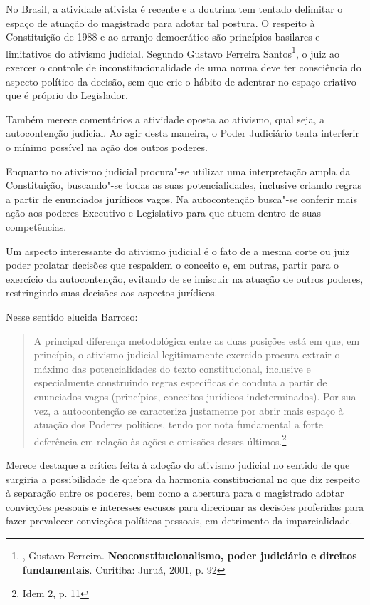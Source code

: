 No Brasil, a atividade ativista é recente e a doutrina tem tentado
delimitar o espaço de atuação do magistrado para adotar tal postura. O
respeito à Constituição de 1988 e ao arranjo democrático são princípios
basilares e limitativos do ativismo judicial. Segundo Gustavo Ferreira
Santos\footnote{, Gustavo Ferreira. \textbf{Neoconstitucionalismo,
  poder judiciário e} \textbf{direitos fundamentais}. Curitiba: Juruá,
  2001, p. 92}, o juiz ao exercer o controle de inconstitucionalidade de
uma norma deve ter consciência do aspecto político da decisão, sem que
crie o hábito de adentrar no espaço criativo que é próprio do
Legislador.

Também merece comentários a atividade oposta ao ativismo, qual seja, a
autocontenção judicial. Ao agir desta maneira, o Poder Judiciário tenta
interferir o mínimo possível na ação dos outros poderes.

Enquanto no ativismo judicial procura"-se utilizar uma interpretação
ampla da Constituição, buscando"-se todas as suas potencialidades,
inclusive criando regras a partir de enunciados jurídicos vagos. Na
autocontenção busca"-se conferir mais ação aos poderes Executivo e
Legislativo para que atuem dentro de suas competências.

Um aspecto interessante do ativismo judicial é o fato de a mesma corte
ou juiz poder prolatar decisões que respaldem o conceito e, em outras,
partir para o exercício da autocontenção, evitando de se imiscuir na
atuação de outros poderes, restringindo suas decisões aos aspectos
jurídicos.

Nesse sentido elucida Barroso:

\begin{quote}
A principal diferença metodológica entre as duas posições está em que,
em princípio, o ativismo judicial legitimamente exercido procura extrair
o máximo das potencialidades do texto constitucional, inclusive e
especialmente construindo regras específicas de conduta a partir de
enunciados vagos (princípios, conceitos jurídicos indeterminados). Por
sua vez, a autocontenção se caracteriza justamente por abrir mais espaço
à atuação dos Poderes políticos, tendo por nota fundamental a forte
deferência em relação às ações e omissões desses últimos.\footnote{Idem
  2, p. 11}
\end{quote}

Merece destaque a crítica feita à adoção do ativismo judicial no sentido
de que surgiria a possibilidade de quebra da harmonia constitucional no
que diz respeito à separação entre os poderes, bem como a abertura para
o magistrado adotar convicções pessoais e interesses escusos para
direcionar as decisões proferidas para fazer prevalecer convicções
políticas pessoais, em detrimento da imparcialidade.

